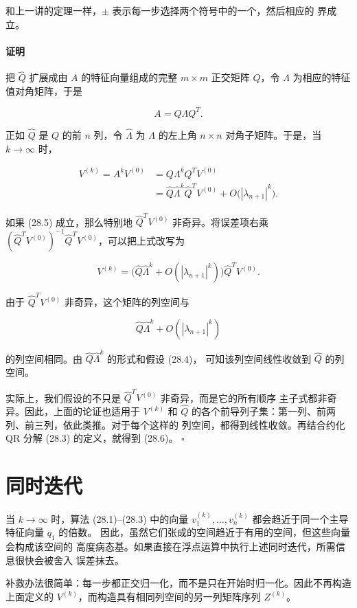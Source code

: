 \documentclass[UTF8,fontset=none,12pt]{ctexart}
\begin{document}
和上一讲的定理一样，$\pm$ 表示每一步选择两个符号中的一个，然后相应的
界成立。

\paragraph{证明}
把 $\widehat Q$ 扩展成由 $A$ 的特征向量组成的完整 $m\times m$ 正交矩阵
$Q$，令 $\Lambda$ 为相应的特征值对角矩阵，于是

$$
A=Q\Lambda Q^T.
$$

正如 $\widehat Q$ 是 $Q$ 的前 $n$ 列，令 $\widehat\Lambda$ 为 $\Lambda$
的左上角 $n\times n$ 对角子矩阵。于是，当 $k\to\infty$ 时，

$$
\begin{aligned}
V^{(k)}=A^kV^{(0)}
 &=Q\Lambda^kQ^TV^{(0)}\\
 &=\widehat Q\widehat\Lambda^k\widehat Q^TV^{(0)}
   +O\bigl(|\lambda_{n+1}|^k\bigr).
\end{aligned}
$$

如果 (28.5) 成立，那么特别地 $\widehat Q^TV^{(0)}$ 非奇异。将误差项右乘
$(\widehat Q^TV^{(0)})^{-1}\widehat Q^TV^{(0)}$，可以把上式改写为

$$
V^{(k)}=
\bigl(\widehat Q\widehat\Lambda^k+O(|\lambda_{n+1}|^k)\bigr)
\widehat Q^TV^{(0)}.
$$

由于 $\widehat Q^TV^{(0)}$ 非奇异，这个矩阵的列空间与

$$
\widehat Q\widehat\Lambda^k+O(|\lambda_{n+1}|^k)
$$

的列空间相同。由 $\widehat Q\widehat\Lambda^k$ 的形式和假设 (28.4)，
可知该列空间线性收敛到 $\widehat Q$ 的列空间。

实际上，我们假设的不只是 $\widehat Q^TV^{(0)}$ 非奇异，而是它的所有顺序
主子式都非奇异。因此，上面的论证也适用于 $V^{(k)}$ 和 $\widehat Q$
的各个前导列子集：第一列、前两列、前三列，依此类推。对于每个这样的
列空间，都得到线性收敛。再结合约化 QR 分解 (28.3) 的定义，就得到 (28.6)。
\hfill$\square$

\section*{同时迭代}

当 $k\to\infty$ 时，算法 (28.1)–(28.3) 中的向量
$v_1^{(k)},\ldots,v_n^{(k)}$ 都会趋近于同一个主导特征向量 $q_1$ 的倍数。
因此，虽然它们张成的空间趋近于有用的空间，但这些向量会构成该空间的
高度病态基。如果直接在浮点运算中执行上述同时迭代，所需信息很快会被舍入
误差抹去。

补救办法很简单：每一步都正交归一化，而不是只在开始时归一化。因此不再构造
上面定义的 $V^{(k)}$，而构造具有相同列空间的另一列矩阵序列 $Z^{(k)}$。
\end{document}
